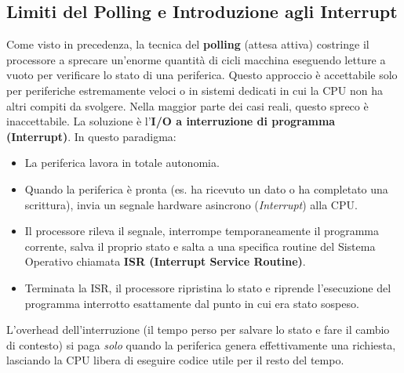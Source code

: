 \documentclass[12pt, a4paper]{article}
\begin{document}
\subsection{Limiti del Polling e Introduzione agli Interrupt}
Come visto in precedenza, la tecnica del \textbf{polling} (attesa attiva) costringe il processore a sprecare un'enorme quantità di cicli macchina eseguendo letture a vuoto per verificare lo stato di una periferica. Questo approccio è accettabile solo per periferiche estremamente veloci o in sistemi dedicati in cui la CPU non ha altri compiti da svolgere.
Nella maggior parte dei casi reali, questo spreco è inaccettabile. La soluzione è l'\textbf{I/O a interruzione di programma (Interrupt)}. In questo paradigma:
\begin{itemize}
    \item La periferica lavora in totale autonomia.
    \item Quando la periferica è pronta (es. ha ricevuto un dato o ha completato una scrittura), invia un segnale hardware asincrono (\textit{Interrupt}) alla CPU.
    \item Il processore rileva il segnale, interrompe temporaneamente il programma corrente, salva il proprio stato e salta a una specifica routine del Sistema Operativo chiamata \textbf{ISR (Interrupt Service Routine)}.
    \item Terminata la ISR, il processore ripristina lo stato e riprende l'esecuzione del programma interrotto esattamente dal punto in cui era stato sospeso.
\end{itemize}
L'overhead dell'interruzione (il tempo perso per salvare lo stato e fare il cambio di contesto) si paga \textit{solo} quando la periferica genera effettivamente una richiesta, lasciando la CPU libera di eseguire codice utile per il resto del tempo.
\end{document}
